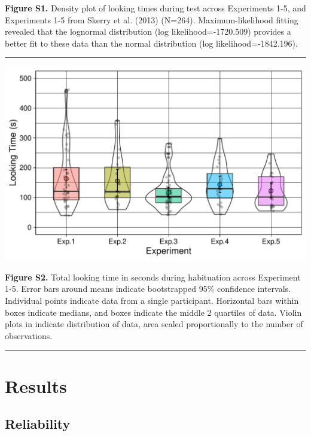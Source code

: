 \documentclass[]{article}
\begin{document}
\textbf{Figure S1.} Density plot of looking times during test across
Experiments 1-5, and Experiments 1-5 from Skerry et al. (2013) (N=264).
Maximum-likelihood fitting revealed that the lognormal distribution (log
likelihood=-1720.509) provides a better fit to these data than the
normal distribution (log likelihood=-1842.196).

\begin{center}\rule{0.5\linewidth}{\linethickness}\end{center}

\includegraphics{lumi_analysis_files/figure-latex/figS2-1.pdf}

\textbf{Figure S2.} Total looking time in seconds during habituation
across Experiment 1-5. Error bars around means indicate bootstrapped
95\% confidence intervals. Individual points indicate data from a single
participant. Horizontal bars within boxes indicate medians, and boxes
indicate the middle 2 quartiles of data. Violin plots in indicate
distribution of data, area scaled proportionally to the number of
observations.

\begin{center}\rule{0.5\linewidth}{\linethickness}\end{center}

\section{Results}\label{results}

\subsection{Reliability}\label{reliability}
\end{document}
